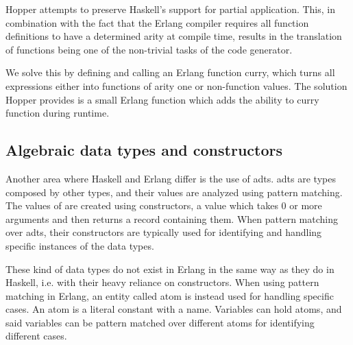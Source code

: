 Hopper attempts to preserve Haskell's support for partial application. This, in combination with the fact that the Erlang compiler requires all function definitions to have a determined arity at compile time, results in the translation of functions being one of the non-trivial tasks of the code generator.%

We solve this by defining and calling an Erlang function curry, which turns all expressions either into functions of arity one or non-function values. %
The solution Hopper provides is a small Erlang function which adds the ability to curry function during runtime. 

\subsection{Algebraic data types and constructors}


Another area where Haskell and Erlang differ is the use of \glspl{adt}. \glspl{adt} are types 
composed by other types, and their values are analyzed using pattern matching. %
The values of are created using constructors, a value which takes 0 or more arguments and then returns a record containing them. When pattern matching over \glspl{adt}, their
constructors are typically used for identifying and handling specific instances of the data types. %

These kind of data types do not exist in Erlang in the same way as they do in Haskell, i.e. with their heavy reliance
on constructors. When using pattern matching in Erlang, an entity called atom is instead used for
handling specific cases. An atom is a literal constant with a name. Variables can hold atoms, and said
variables can be pattern matched over different atoms for identifying different cases.%

